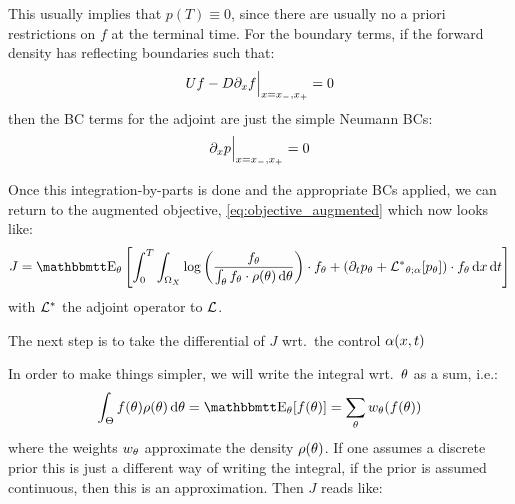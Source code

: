 \documentclass{article}
\begin{document}
This usually implies that $p(T) \equiv 0$, since there are usually no a priori
restrictions on $f$ at the terminal time. For the boundary terms, 
if the forward density has reflecting boundaries such that:
$$
U f - D{\partial}_x f\Big|_{x={ x_{-} }, { x_{+} }}  = 0
$$
then the BC terms for the adjoint are just the simple Neumann BCs:
$$
{\partial}_x p \Big|_{x={ x_{-} }, { x_{+} }} = 0
$$

Once this integration-by-parts is done and the appropriate BCs applied, we
can return to the augmented objective, \cref{eq:objective_augmented} which now
looks like:
\begin{equation}
J =  \Exp_\th
\left[ \int_0^T\int_{\O_X} \log\left(\frac{f_\th}
 					{\int_\th f_\th \cdot \rho(\th)\intd{\th}}\right) 
 			 \cdot f_\th 
 			 + 
 			 (\di_t p_\th + \Lstar_{\th;\a}[p_\th] ) \cdot f_\th
\intd{x}
\intd{t} \right]
\label{eq:objective_augmented_adjoined}
\end{equation}
with ${ { \mathcal{L} }^* }$ the adjoint operator to ${ \mathcal{L} }$.

The next step is to take the differential of $J$ wrt.\ the control
${\alpha}(x,t)$


In order to make things simpler, we will write the integral wrt.\
${\theta}$ as a sum, i.e.:
$$
\int_\Theta f(\th) \rho(\th) \intd{\th} = \Exp_\th [f(\th) ] = 
\sum_\th w_\th (f(\th))
$$ where the weights $w_{\theta}$ approximate the density $\rho({\theta})$.
If one assumes a discrete prior this is just a different way of writing the
integral, if the prior is assumed continuous, then this is an approximation.
Then $J$ reads like:
\end{document}
